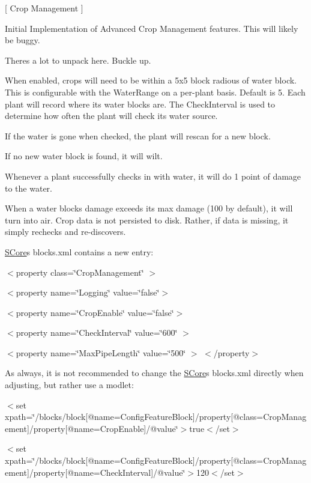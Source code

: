 \mbox{[} Crop Management \mbox{]}
\begin{DoxyItemize}
\item Initial Implementation of Advanced Crop Management features. This will likely be buggy.
\item There\textquotesingle{}s a lot to unpack here. Buckle up.
\item When enabled, crops will need to be within a 5x5 block radious of water block. This is configurable with the Water\+Range on a per-\/plant basis. Default is 5. Each plant will record where it\textquotesingle{}s water blocks are. The Check\+Interval is used to determine how often the plant will check its water source.
\begin{DoxyItemize}
\item If the water is gone when checked, the plant will rescan for a new block.
\item If no new water block is found, it will wilt.
\item Whenever a plant successfully checks in with water, it will do 1 point of damage to the water.
\begin{DoxyItemize}
\item When a water block\textquotesingle{}s damage exceeds its max damage (100 by default), it will turn into air. Crop data is not persisted to disk. Rather, if data is missing, it simply rechecks and re-\/discovers.
\end{DoxyItemize}
\end{DoxyItemize}
\item \mbox{\hyperlink{namespace_s_core}{SCore}}\textquotesingle{}s blocks.\+xml contains a new entry\+:

$<$property class=\char`\"{}\+Crop\+Management\char`\"{} $>$

$<$property name=\char`\"{}\+Logging\char`\"{} value=\char`\"{}false\char`\"{}$>$

$<$property name=\char`\"{}\+Crop\+Enable\char`\"{} value=\char`\"{}false\char`\"{}$>$

$<$property name=\char`\"{}\+Check\+Interval\char`\"{} value=\char`\"{}600\char`\"{} $>$

$<$property name=\char`\"{}\+Max\+Pipe\+Length\char`\"{} value=\char`\"{}500\char`\"{} $>$ $<$/property$>$

As always, it is not recommended to change the \mbox{\hyperlink{namespace_s_core}{SCore}}\textquotesingle{}s blocks.\+xml directly when adjusting, but rather use a modlet\+:

$<$set xpath=\char`\"{}/blocks/block\mbox{[}@name=\textquotesingle{}\+Config\+Feature\+Block\textquotesingle{}\mbox{]}/property\mbox{[}@class=\textquotesingle{}\+Crop\+Management\textquotesingle{}\mbox{]}/property\mbox{[}@name=\textquotesingle{}\+Crop\+Enable\textquotesingle{}\mbox{]}/@value\char`\"{}$>$true$<$/set$>$

$<$set xpath=\char`\"{}/blocks/block\mbox{[}@name=\textquotesingle{}\+Config\+Feature\+Block\textquotesingle{}\mbox{]}/property\mbox{[}@class=\textquotesingle{}\+Crop\+Management\textquotesingle{}\mbox{]}/property\mbox{[}@name=\textquotesingle{}\+Check\+Interval\textquotesingle{}\mbox{]}/@value\char`\"{}$>$120$<$/set$>$
\end{DoxyItemize}

